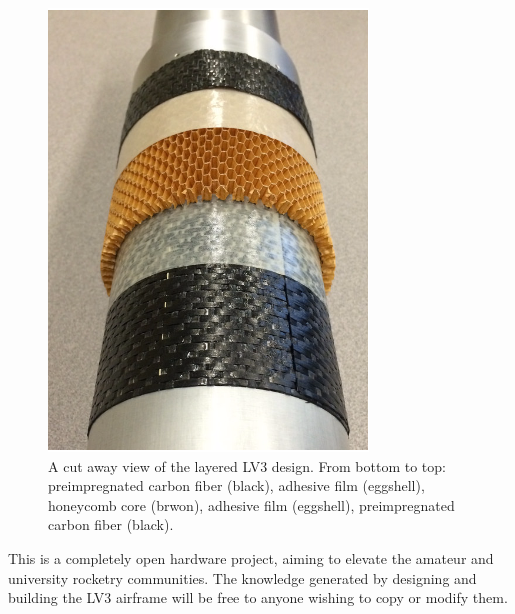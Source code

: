 \documentclass{aiaa-tc}%
\begin{document}
\begin{figure}
\centering
\includegraphics[width=\linewidth]{img/layers.png}
\caption{A cut away view of the layered LV3 design. From bottom to top: preimpregnated carbon fiber (black), adhesive film (eggshell), honeycomb core (brwon), adhesive film (eggshell), preimpregnated carbon fiber (black).}
\label{fig:layers}
\end{figure}

This is a completely open hardware project, aiming to elevate the amateur and university rocketry communities. The knowledge generated by designing and building the LV3 airframe will be free to anyone wishing to copy or modify them. 
\end{document}
